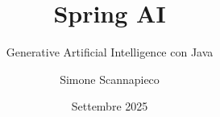 \title[Spring AI base]{Spring AI}

\subtitle{Generative Artificial Intelligence con Java}


\date{Settembre 2025}

\author[S.Scannapieco]{Simone Scannapieco}


\begin{frame}[fragile]
	
	\titlepage

\end{frame}